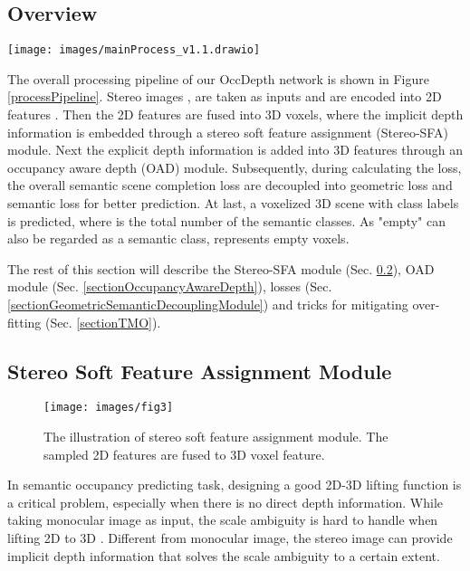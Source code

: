 \documentclass{article}
\begin{document}
	\subsection{Overview}
	\begin{figure*}[!t]
		\centering
		\texttt{[image: images/mainProcess\_v1.1.drawio]}
		\caption{The process pipeline of the proposed OccDepth. The 3D SSC is inferred from stereo images with bridging a Stereo-SFA module to lift features to 3D space, an OAD module to enhance depth prediction, and a 3D U-Net to extract geometry and semantics. The stereo depth network is only used in training for giving a depth supervision.}
		\label{processPipeline}
	\end{figure*}
	The overall processing pipeline of our OccDepth network is shown in Figure \ref{processPipeline}. Stereo images ,  are taken as inputs and are encoded into 2D features . Then the 2D features are fused into 3D voxels, where the implicit depth information is embedded through a stereo soft feature assignment (Stereo-SFA) module. Next the explicit depth information is added into 3D features through an occupancy aware depth (OAD) module. Subsequently, during calculating the loss, the overall semantic scene completion loss are decoupled into geometric loss and semantic loss for better prediction. At last, a voxelized 3D scene  with class labels  is predicted, where  is the total number of the semantic classes. As "empty" can also be regarded as a semantic class,  represents empty voxels.
	
	The rest of this section will describe the Stereo-SFA module (Sec. \ref{sectionFeaturePrjection}), OAD module (Sec. \ref{sectionOccupancyAwareDepth}), losses (Sec. \ref{sectionGeometricSemanticDecouplingModule}) and tricks for mitigating over-fitting (Sec. \ref{sectionTMO}).
	
	\subsection{Stereo Soft Feature Assignment Module}
	\label{sectionFeaturePrjection}
	\begin{figure}[!t]
		\centering
		\texttt{[image: images/fig3]}
		\caption{The illustration of stereo soft feature assignment module. The sampled 2D features are fused to 3D voxel feature.}
		\label{StereoFeatureAssignment}
	\end{figure}
	In semantic occupancy predicting task, designing a good 2D-3D lifting function is a critical problem, especially when there is no direct depth information. While taking monocular image as input, the scale ambiguity is hard to handle when lifting 2D to 3D \cite{fahim2021single}. Different from monocular image, the stereo image can provide implicit depth information that solves the scale ambiguity to a certain extent.
	
\end{document}
